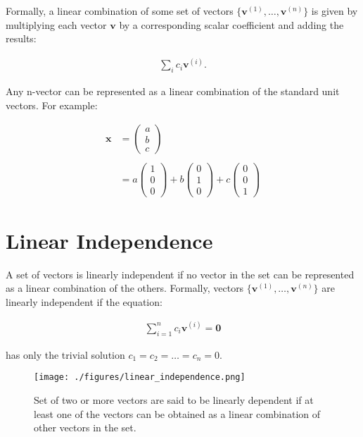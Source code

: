 \documentclass[12pt]{article}
\begin{document}
Formally, a linear combination of some set of vectors $\{\mathbf{v}^{(1)},\ldots, \mathbf{v}^{(n)} \}$ is given by multiplying each vector $\mathbf{v}$ by a corresponding scalar coefficient and adding the results:

\begin{align}
\sum_{i}{c}_{i}\mathbf{v}^{(i)}.
\end{align}

Any n-vector can be represented as a linear combination of the standard unit vectors. For example:

\begin{align}
\mathbf{x} &= \begin{pmatrix}a\\ b\\ c\end{pmatrix} \\ \\
&= a\begin{pmatrix}1\\ 0\\ 0\end{pmatrix}+b\begin{pmatrix}0\\ 1\\ 0\end{pmatrix}+c\begin{pmatrix}0\\ 0\\ 1\end{pmatrix}
\end{align}

\section{Linear Independence}

A set of vectors is linearly independent if no vector in the set can be represented as a linear combination of the others. Formally, vectors $\{\mathbf{v}^{(1)},\ldots, \mathbf{v}^{(n)} \}$ are linearly independent if the equation:

\begin{align}
\sum_{i=1}^n c_i\mathbf{v}^{(i)} = \mathbf{0}
\end{align}

has only the trivial solution $c_1 = c_2 = \dots = c_n = 0$.

\begin{figure}[h]
\centering
\texttt{[image: ./figures/linear\_independence.png]}
\caption{Set of two or more vectors are said to be linearly dependent if at least one of the vectors can be obtained as a linear combination of other vectors in the set.}
\label{fig:linear_independence}
\end{figure}
\end{document}
